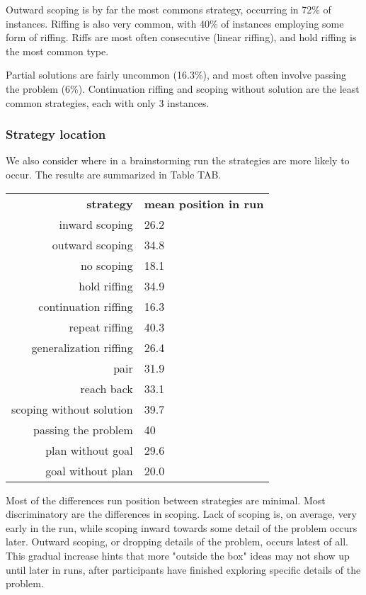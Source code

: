 Outward scoping is by far the most commons strategy, occurring in 72\% of instances. Riffing is also very common, with 40\% of instances employing some form of riffing. Riffs are most often consecutive (linear riffing), and hold riffing is the most common type.

Partial solutions are fairly uncommon (16.3\%), and most often involve passing the problem (6\%). Continuation riffing and scoping without solution are the least common strategies, each with only 3 instances.

\subsubsection{Strategy location}

We also consider where in a brainstorming run the strategies are more likely to occur. The results are summarized in Table TAB.

\begin{table}
    \begin{tabular}{r | l}
        \textbf{strategy} & \textbf{mean position in run} \\
        inward scoping & 26.2 \\
        outward scoping & 34.8 \\
        no scoping & 18.1 \\
        \hline \hline
        hold riffing & 34.9 \\
        continuation riffing & 16.3 \\
        repeat riffing & 40.3 \\
        generalization riffing & 26.4 \\
        \hline
        pair & 31.9 \\
        reach back & 33.1 \\
        \hline \hline
        scoping without solution & 39.7 \\
        passing the problem & 40 \\
        plan without goal & 29.6 \\
        goal without plan & 20.0 \\ 
    \end{tabular}
\end{table}

Most of the differences run position between strategies are minimal. Most discriminatory are the differences in scoping. Lack of scoping is, on average, very early in the run, while scoping inward towards some detail of the problem occurs later. Outward scoping, or dropping details of the problem, occurs latest of all. This gradual increase hints that more "outside the box" ideas may not show up until later in runs, after participants have finished exploring specific details of the problem.

